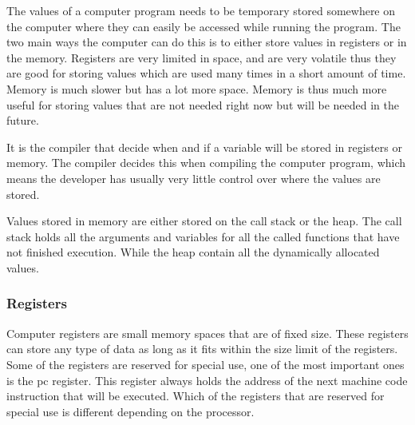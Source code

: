  

The values of a computer program needs to be temporary stored somewhere on the computer where they can easily be accessed while running the program.
The two main ways the computer can do this is to either store values in registers or in the memory.
Registers are very limited in space, and are very volatile thus they are good for storing values which are used many times in a short amount of time.
Memory is much slower but has a lot more space.
Memory is thus much more useful for storing values that are not needed right now but will be needed in the future.


It is the compiler that decide when and if a variable will be stored in registers or memory.
The compiler decides this when compiling the computer program, which means the developer has usually very little control over where the values are stored.


Values stored in memory are either stored on the call stack or the heap.
The call stack holds all the arguments and variables for all the called functions that have not finished execution.
While the heap contain all the dynamically allocated values.


\subsubsection{Registers}
Computer registers are small memory spaces that are of fixed size.
These registers can store any type of data as long as it fits within the size limit of the registers.
Some of the registers are reserved for special use, one of the most important ones is the \acrfull{pc} register.
This register always holds the address of the next machine code instruction that will be executed.
Which of the registers that are reserved for special use is different depending on the processor.


